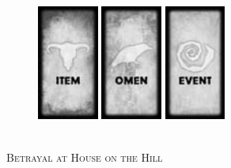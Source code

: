 \begin{titlepage}

\begin{center}


\hspace{2cm}
\vspace{2cm}
\begin{figure}[h!]
    \begin{minipage}[t]{0.4\textwidth}\vspace{0pt}
        \centering
        \includegraphics[width=2cm]{resources/item2}
    \end{minipage}\hfill%
    \begin{minipage}[t]{0.2\textwidth}\vspace{0pt}
        \centering
        \includegraphics[width=2cm]{resources/omen2}
    \end{minipage}\hfill%
    \begin{minipage}[t]{0.4\textwidth}\vspace{0pt}
        \centering
        \includegraphics[width=2cm]{resources/event2}
    \end{minipage}\hfill%
\end{figure}

\\[1.5cm]

\textsc{\LARGE Betrayal at House on the Hill}\\[0.5cm]


\end{center}
\end{titlepage}
